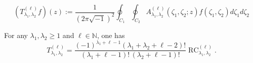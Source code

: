 \documentclass[10pt,a4paper]{amsart}
\newcommand{\RC}{\operatorname{RC}}
\begin{document}
\begin{equation}
\label{eqn:Tl}
   (T_{\lambda_1, \lambda_2}^{(\ell)} f)(z)
   :=
   \frac 1 {(2 \pi \sqrt{-1})^2}
   \oint_{C_1} \oint_{C_2}
   A_{\lambda_1, \lambda_2}^{(\ell)}(\zeta_1, \zeta_2;z)
   f(\zeta_1,\zeta_2) d \zeta_1 d \zeta_2
\end{equation}

\begin{theorem}
\label{thm:RCresidue}
For any $\lambda_1, \lambda_2 \ge 1$ and $\ell \in {\mathbb{N}}$,
 one has
\begin{equation*}
   T_{\lambda_1, \lambda_2}^{(\ell)}
=
 \frac {(-1)^{\lambda_1+\ell-1}(\lambda_1 + \lambda_2 + \ell -2) ! }
       {(\lambda_1+\ell-1) ! \, (\lambda_2 + \ell -1)!}
\RC_{\lambda_1, \lambda_2}^{(\ell)}.  
\end{equation*}
\end{theorem}
\end{document}
